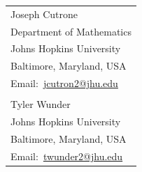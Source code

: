 \documentclass[11pt]{article}
\makeatletter
\theoremstyle{definition}
\newenvironment{contact}{
 \vspace{0.5em}
 \begin{center}
 \begin{tabular}{@{}l}
}{
 \end{tabular}
 \end{center}
 \vspace{0.5em}
}
\newcommand{\email}[1]{Email:~\url{#1}}
\theoremstyle{definition}
\makeatother
\begin{document}
\clearpage
\nocite{ElHelaly2019}
\nocite{FYS_Textbook}
\nocite{huntington-a-new}
\nocite{Huntington-theory}
\nocite{b-young-methods}
\printbibliography

\vspace{2in}
\begin{contact}
Joseph Cutrone\\
Department of Mathematics\\
Johns Hopkins University\\
Baltimore, Maryland, USA\\
\email{jcutron2@jhu.edu}\\\\

Tyler Wunder\\
Johns Hopkins University\\
Baltimore, Maryland, USA\\
\email{twunder2@jhu.edu}
\end{contact}


\end{document}
